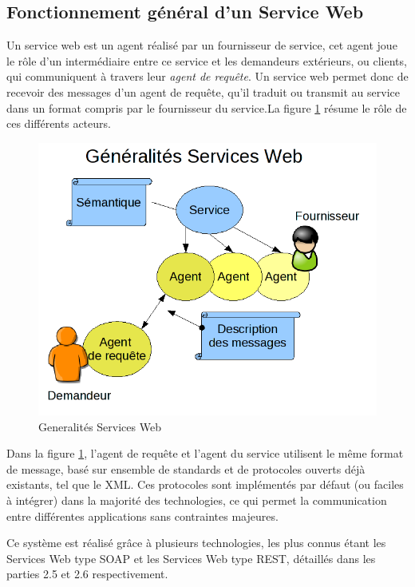 		\subsection{Fonctionnement général d'un Service Web}
			Un service web est un agent réalisé par un fournisseur de service, cet agent joue le rôle d'un intermédiaire entre ce service et les demandeurs extérieurs, ou clients, qui communiquent à travers leur \emph{agent de requête}. 
\newline			
Un service web permet donc de recevoir des messages d'un agent de requête, qu'il traduit ou transmit au service dans un format compris par le fournisseur du service.\newline La figure \ref{Generalite_figure} résume le rôle de ces différents acteurs.
		\begin{figure}[h]
			\center
			\includegraphics[scale=0.5]{img/Whatisaserviceweb.png}
			\caption{Generalités Services Web}		
			\label{Generalite_figure}
			\centering
		\end{figure}						
		\newline
 Dans la figure \ref{Generalite_figure}, l'agent de requête et l'agent du service utilisent le même format de message, basé sur ensemble de standards et de protocoles ouverts déjà existants, tel que le XML.
	Ces protocoles sont implémentés par défaut (ou faciles à intégrer) dans la majorité des technologies, ce qui permet la communication entre différentes applications sans contraintes majeures. 
	
	Ce système est réalisé grâce à plusieurs technologies, les plus connus étant les Services Web type SOAP et les Services Web type REST, détaillés dans les parties 2.5 et 2.6 respectivement.
	
